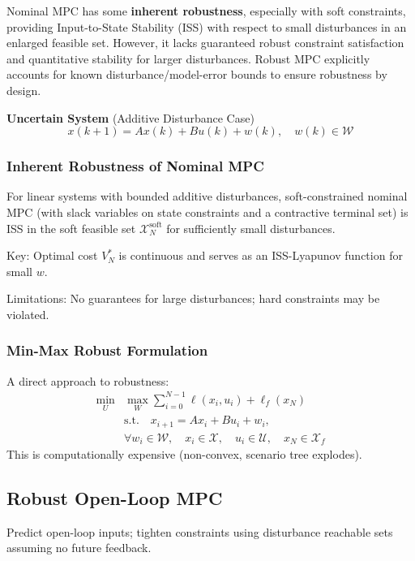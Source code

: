 
Nominal MPC has some \textbf{inherent robustness}, especially with
soft constraints, providing Input-to-State Stability (ISS) with
respect to small disturbances in an enlarged feasible set. However,
it lacks guaranteed robust constraint satisfaction and quantitative
stability for larger disturbances. Robust MPC explicitly accounts for
known disturbance/model-error bounds to ensure robustness by design.

\textbf{Uncertain System} (Additive Disturbance Case)
\[
  x(k+1) = A x(k) + B u(k) + w(k), \quad w(k) \in \mathcal{W}
\]

\subsubsection{Inherent Robustness of Nominal MPC}

For linear systems with bounded additive disturbances,
soft-constrained nominal MPC (with slack variables on state
constraints and a contractive terminal set) is ISS in the soft
feasible set $\mathcal{X}_N^\text{soft}$ for sufficiently small disturbances.

Key: Optimal cost $V_N^*$ is continuous and serves as an ISS-Lyapunov
function for small $w$.

Limitations: No guarantees for large disturbances; hard constraints
may be violated.

\subsubsection{Min-Max Robust Formulation}

A direct approach to robustness:
\begin{align*}
  \min_{U} &\max_{W} \sum_{i=0}^{N-1} \ell(x_{i}, u_{i}) + \ell_f(x_N)\\
  &  \text{s.t.} \quad x_{i+1} = A x_{i} + B u_{i} + w_{i}, \\
  &  \forall w_{i} \in \mathcal{W}, \quad x_{i} \in \mathcal{X},
  \quad  u_{i} \in \mathcal{U}, \quad x_N \in \mathcal{X}_f
\end{align*}
This is computationally expensive (non-convex, scenario tree explodes).

\subsection{Robust Open-Loop MPC}

Predict open-loop inputs; tighten constraints using disturbance
reachable sets assuming no future feedback.

